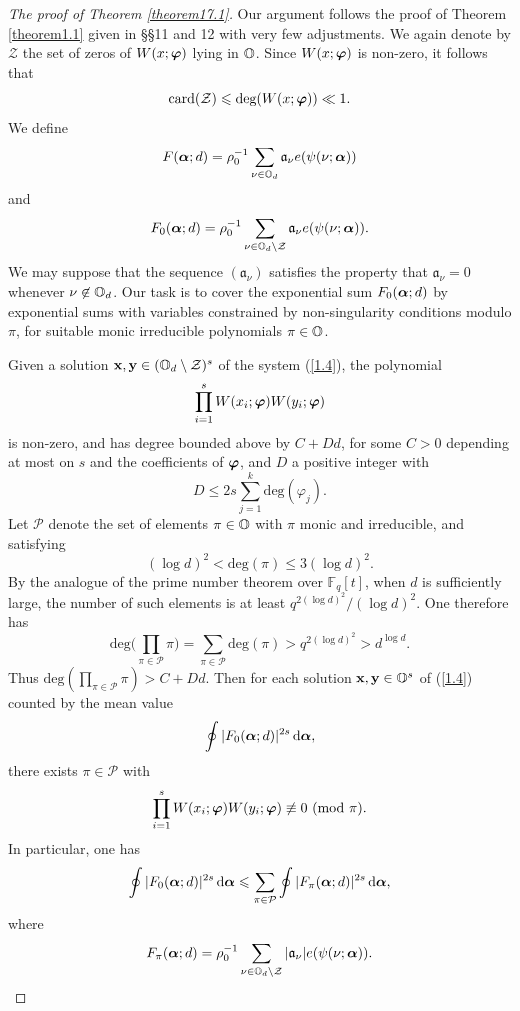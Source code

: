 \documentclass[12pt,reqno]{amsart}
\theoremstyle{definition}
\theoremstyle{remark}
\numberwithin{equation}{section}
\newcommand{\mmod}[1]{\,\,(\text{\rm mod}\,\,#1)}
\def\bfx{{\mathbf x}}
\def\bfy{{\mathbf y}}
\def\calP{{\mathcal P}}
\def\calZ{{\mathcal Z}}
\def\dbF{{\mathbb F}}\def\dbK{{\mathbb K}}
\def\gra{{\mathfrak a}}\def\grA{{\mathfrak A}}\def\bfgra{{\boldsymbol \gra}}
\def\le{\leqslant} \def\ge{\geqslant} \def\pleq{\preccurlyeq} \def\ple{\prec}
\def\d{{\,{\rm d}}}
\begin{document}
\begin{proof}[The proof of Theorem \ref{theorem17.1}] Our argument follows the proof of 
Theorem \ref{theorem1.1} given in \S\S11 and 12 with very few adjustments. We again 
denote by $\calZ$ the set of zeros of $W(x;{\boldsymbol \varphi})$ lying in ${\mathbb O}$. Since 
$W(x;{\boldsymbol \varphi})$ is non-zero, it follows that
$$\text{card}(\calZ)\le \text{deg}(W(x;\bfvarphi))\ll 1.$$
We define
$$F(\bfalp;d)=\rho_0^{-1}\sum_{\nu \in \dbO_d}\gra_\nu e(\psi(\nu;\bfalp))$$
and
$$F_0(\bfalp;d)=\rho_0^{-1}\sum_{\nu \in \dbO_d\setminus \calZ}\gra_\nu 
e(\psi(\nu;\bfalp)).$$
We may suppose that the sequence $(\gra_\nu)$ satisfies the property that $\gra_\nu=0$ 
whenever $\nu\not\in {\mathbb O}_d$. Our task is to cover the exponential sum $F_0({\boldsymbol \alpha};d)$ by 
exponential sums with variables constrained by non-singularity conditions modulo $\pi$, for 
suitable monic irreducible polynomials $\pi\in {\mathbb O}$.\par

Given a solution $\bfx,\bfy\in (\dbO_d\setminus \calZ)^s$ of the system (\ref{1.4}), the 
polynomial
$$\prod_{i=1}^sW(x_i;{\boldsymbol \varphi})W(y_i;{\boldsymbol \varphi})$$
is non-zero, and has degree bounded above by $C+Dd$, for some $C>0$ depending at 
most on $s$ and the coefficients of ${\boldsymbol \varphi}$, and $D$ a positive integer with
$$D\le 2s\sum_{j=1}^k\text{deg}(\varphi_j).$$
Let $\calP$ denote the set of elements $\pi \in {\mathbb O}$ with $\pi$ monic and irreducible, and 
satisfying
$$(\log d)^2<\text{deg}(\pi)\le 3(\log d)^2.$$
By the analogue of the prime number theorem over $\dbF_q[t]$, when $d$ is sufficiently 
large, the number of such elements is at least $q^{2(\log d)^2}/(\log d)^2$. 
One therefore has
$$\text{deg}\biggl( \prod_{\pi\in \calP}\pi\biggr) =\sum_{\pi \in \calP}\text{deg}(\pi)
>q^{2(\log d)^2}>d^{\log d}.$$
Thus $\text{deg}\left( \prod_{\pi\in \calP}\pi\right) >C+Dd$. Then for each solution 
$\bfx, \bfy\in \dbO^s$ of (\ref{1.4}) counted by the mean value
$$\oint |F_0(\bfalp;d)|^{2s}\d\bfalp ,$$
there exists $\pi \in \calP$ with
$$\prod_{i=1}^s W(x_i;\bfvarphi)W(y_i;\bfvarphi)\not \equiv 0\mmod{\pi}.$$
In particular, one has
\begin{equation}\label{17.2}
\oint |F_0(\bfalp;d)|^{2s}\d\bfalp \le \sum_{\pi \in \calP}\oint 
|F_\pi (\bfalp;d)|^{2s}\d\bfalp ,
\end{equation}
where
$$F_\pi (\bfalp;d)=\rho_0^{-1}\sum_{\nu \in \dbO_d\setminus \calZ}|\gra_\nu|
e(\psi(\nu;\bfalp )).$$


\end{proof}
\end{document}
